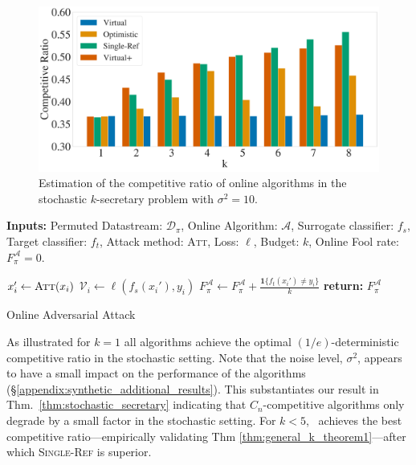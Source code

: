 \begin{minipage}[t]{.48\textwidth}
\begin{figure}[H]
     \vspace{-15pt}
    \includegraphics[width=1.01\linewidth]{Figures/Competitive_Ratio3Bar8-Var-10.pdf}
    \vspace{-15pt}
    \caption{Estimation of the competitive ratio of online algorithms in the stochastic $k$-secretary problem with $\sigma^2=10$.}
    \label{fig:synthetic_data}
\end{figure}
\end{minipage}
\hfill
\begin{minipage}[t]{.48\textwidth}
\vspace{-15pt}  
    \begin{algorithm}[H]
    \small
    \textbf{Inputs:} Permuted Datastream: $\mathcal{D}_\pi$, Online Algorithm: $\mathcal{A}$,  Surrogate classifier: $f_s$, Target classifier: $f_t$,  Attack method: \textsc{Att}, Loss: $\ell$,  Budget: $k$,  
    Online Fool rate: $F^{\mathcal{A}}_\pi=0$.
    \begin{algorithmic}[1]
    \STATE $x_i' \leftarrow  \textsc{Att}(x_i)$ \hfill {}
    \STATE $\mathcal{V}_i \leftarrow \ell(f_s(x_i'),y_i)$  \hfill {}
    \STATE  $F^{\mathcal{A}}_\pi \leftarrow F^{\mathcal{A}}_\pi+\tfrac{\mathbf{1}\{f_t(x_i')\neq y_i\}}{k}$  \hfill{} 
    \ENDIF
    \ENDFOR
    \STATE \textbf{return:} $F^{\mathcal{A}}_\pi$ \hfill{} 
    \end{algorithmic}
     \caption{\small Online Adversarial Attack}
     \label{alg:online_adv_attack}
    \end{algorithm}
\end{minipage}

As illustrated for $k=1$ all algorithms achieve the optimal $(1/e)$-deterministic competitive ratio in the stochastic setting. Note that the noise level, $\sigma^2$, appears to have a small impact on the performance of the algorithms (\S\ref{appendix:synthetic_additional_results}). 
This substantiates our result in Thm.~\ref{thm:stochastic_secretary} indicating that $C_n$-competitive algorithms only degrade by a small factor in the stochastic setting. For $k<5$, \algoname\ achieves the best competitive ratio---empirically validating Thm \ref{thm:general_k_theorem1}---after which \textsc{Single-Ref} is superior.
